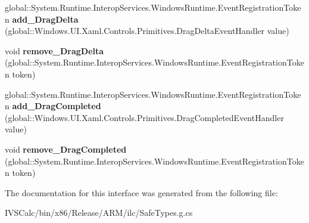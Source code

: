 \begin{DoxyCompactItemize}
\item 
\mbox{\label{interface_windows_1_1_u_i_1_1_xaml_1_1_controls_1_1_primitives_1_1_i_thumb_adb368ed2352b40482e7d4b409ff13165}} 
global\+::\+System.\+Runtime.\+Interop\+Services.\+Windows\+Runtime.\+Event\+Registration\+Token {\bfseries add\+\_\+\+Drag\+Delta} (global\+::\+Windows.\+U\+I.\+Xaml.\+Controls.\+Primitives.\+Drag\+Delta\+Event\+Handler value)
\item 
\mbox{\label{interface_windows_1_1_u_i_1_1_xaml_1_1_controls_1_1_primitives_1_1_i_thumb_a7f2e0d4f77e1da383618536040a32d00}} 
void {\bfseries remove\+\_\+\+Drag\+Delta} (global\+::\+System.\+Runtime.\+Interop\+Services.\+Windows\+Runtime.\+Event\+Registration\+Token token)
\item 
\mbox{\label{interface_windows_1_1_u_i_1_1_xaml_1_1_controls_1_1_primitives_1_1_i_thumb_ad9d99e0f3518ed7231b6226b63c2d3e9}} 
global\+::\+System.\+Runtime.\+Interop\+Services.\+Windows\+Runtime.\+Event\+Registration\+Token {\bfseries add\+\_\+\+Drag\+Completed} (global\+::\+Windows.\+U\+I.\+Xaml.\+Controls.\+Primitives.\+Drag\+Completed\+Event\+Handler value)
\item 
\mbox{\label{interface_windows_1_1_u_i_1_1_xaml_1_1_controls_1_1_primitives_1_1_i_thumb_a9c342427ff81fa677a36391138856518}} 
void {\bfseries remove\+\_\+\+Drag\+Completed} (global\+::\+System.\+Runtime.\+Interop\+Services.\+Windows\+Runtime.\+Event\+Registration\+Token token)
\end{DoxyCompactItemize}


The documentation for this interface was generated from the following file\+:\begin{DoxyCompactItemize}
\item 
I\+V\+S\+Calc/bin/x86/\+Release/\+A\+R\+M/ilc/Safe\+Types.\+g.\+cs\end{DoxyCompactItemize}
